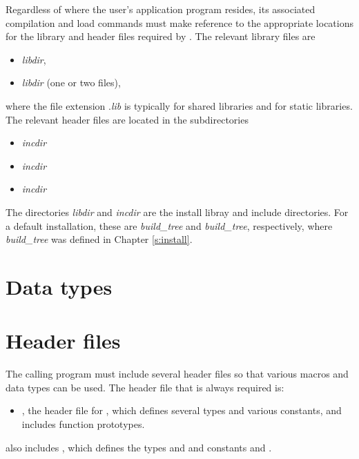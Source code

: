 Regardless of where the user's application program resides, its
associated compilation and load commands must make reference to the
appropriate locations for the library and header files required by
{\kinsol}.  The relevant library files are
\begin{itemize}
\item {\em libdir},
\item {\em libdir} (one or two files),
\end{itemize}
where the file extension .{\em lib} is typically  for shared libraries
and  for static libraries. The relevant header files are located in
the subdirectories
\begin{itemize}
\item {\em incdir}
\item {\em incdir}
\item {\em incdir}
\end{itemize}
The directories {\em libdir} and {\em incdir} are the install libray and include
directories. For a default installation, these are {\em build\_tree} and
{\em build\_tree}, respectively, where {\em build\_tree} was defined in
Chapter \ref{s:install}.

\section{Data types}\label{s:types}


\section{Header files}\label{s:header_sol}
The calling program must include several header files so that various macros
and data types can be used. The header file that is always required is:
%
\begin{itemize}
\item  {}, 
  the header file for {\kinsol}, which defines several
  types and various constants, and includes function prototypes.
\end{itemize}
%
 also includes , 
which defines the types  and 
and constants  and .

